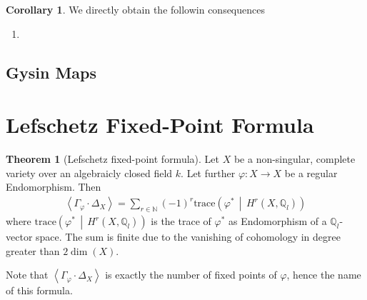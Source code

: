 \documentclass[english]{scrartcl}
\theoremstyle{definition}
\newtheorem{Thm}[Def]{Theorem}
\newtheorem{Cor}[Def]{Corollary}
\theoremstyle{remark}
\newcommand*{\N}{\mathds{N}}
\newcommand*{\Z}{\mathds{Z}}
\newcommand*{\Q}{\mathds{Q}}
\newcommand*{\Zl}{\Z_l} %
\newcommand*{\Ql}{\Q_l} %
\newcommand*{\intProd}[2]{{#1\cdot#2}} %
\newcommand*{\intNum}[1]{{\left\langle{#1}\right\rangle}} %
\newcommand*{\Graph}[1]{{\Gamma_{#1}}} %
\newcommand*{\Diag}[1]{{\Delta_{#1}}} %
\newcommand*{\trace}[2]{{\text{trace}\left(#1 \,\middle|\, #2 \right)}} %
\renewcommand*{\phi}{\varphi}
\begin{document}
\begin{Cor}
  We directly obtain the followin consequences
  \begin{enumerate}
  \item 
  \end{enumerate}
\end{Cor}


\subsection{Gysin Maps}

\section{Lefschetz Fixed-Point Formula}

\begin{Thm}[Lefschetz fixed-point formula]\label{lefschetzthm}
  Let $X$ be a non-singular, complete variety over an algebraicly
  closed field $k$.
  Let further $\phi\colon X\to X$ be a regular Endomorphism.
  Then
  \begin{gather*}
    \intNum{\intProd{\Graph{\phi}}{\Diag{X}}}
    = \sum_{r\in\N} (-1)^r \trace{\phi^*}{H^r(X,\Ql)}
  \end{gather*}
  where $\trace{\phi^*}{H^r(X,\Ql)}$ is the trace of $\phi^*$ as
  Endomorphism of a $\Ql$-vector space. 
  The sum is finite due to the vanishing
  of cohomology in degree greater than $2\dim(X)$. 
\end{Thm}
Note that $\intNum{\intProd{\Graph{\phi}}{\Diag{X}}}$ is exactly the number of
fixed points of $\phi$, hence the name of this formula.
\end{document}

